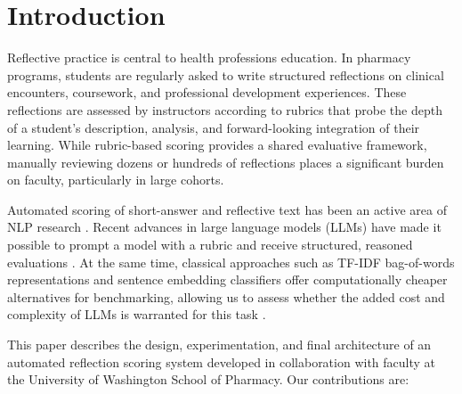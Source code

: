 \documentclass[11pt]{article}
\begin{document}
\section{Introduction}

Reflective practice is central to health professions education. In pharmacy programs, students are regularly asked to write structured reflections on clinical encounters, coursework, and professional development experiences. These reflections are assessed by instructors according to rubrics that probe the depth of a student's description, analysis, and forward-looking integration of their learning. While rubric-based scoring provides a shared evaluative framework, manually reviewing dozens or hundreds of reflections places a significant burden on faculty, particularly in large cohorts.

Automated scoring of short-answer and reflective text has been an active area of NLP research \citep{burstein2003automated, shermis2013handbook}. Recent advances in large language models (LLMs) have made it possible to prompt a model with a rubric and receive structured, reasoned evaluations \citep{brown2020language, wei2022chain}. At the same time, classical approaches such as TF-IDF bag-of-words representations and sentence embedding classifiers offer computationally cheaper alternatives for benchmarking, allowing us to assess whether the added cost and complexity of LLMs is warranted for this task \citep{reimers2019sentence}.




This paper describes the design, experimentation, and final architecture of an automated reflection scoring system developed in collaboration with faculty at the University of Washington School of Pharmacy. Our contributions are:
\end{document}

